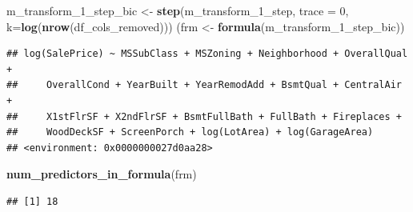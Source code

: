 \documentclass[
]{article}
\newenvironment{Shaded}{\begin{snugshade}}{\end{snugshade}}
\newcommand{\DataTypeTok}[1]{\textcolor[rgb]{0.13,0.29,0.53}{#1}}
\newcommand{\DecValTok}[1]{\textcolor[rgb]{0.00,0.00,0.81}{#1}}
\newcommand{\KeywordTok}[1]{\textcolor[rgb]{0.13,0.29,0.53}{\textbf{#1}}}
\newcommand{\NormalTok}[1]{#1}
\newcommand{\StringTok}[1]{\textcolor[rgb]{0.31,0.60,0.02}{#1}}
\begin{document}
\begin{Shaded}
\begin{Highlighting}[]
\NormalTok{m_transform_}\DecValTok{1}\NormalTok{_step_bic <-}\StringTok{ }\KeywordTok{step}\NormalTok{(m_transform_}\DecValTok{1}\NormalTok{_step, }\DataTypeTok{trace =} \DecValTok{0}\NormalTok{, }\DataTypeTok{k=}\KeywordTok{log}\NormalTok{(}\KeywordTok{nrow}\NormalTok{(df_cols_removed)))}
\NormalTok{(frm <-}\StringTok{ }\KeywordTok{formula}\NormalTok{(m_transform_}\DecValTok{1}\NormalTok{_step_bic))}
\end{Highlighting}
\end{Shaded}

\begin{verbatim}
## log(SalePrice) ~ MSSubClass + MSZoning + Neighborhood + OverallQual + 
##     OverallCond + YearBuilt + YearRemodAdd + BsmtQual + CentralAir + 
##     X1stFlrSF + X2ndFlrSF + BsmtFullBath + FullBath + Fireplaces + 
##     WoodDeckSF + ScreenPorch + log(LotArea) + log(GarageArea)
## <environment: 0x0000000027d0aa28>
\end{verbatim}

\begin{Shaded}
\begin{Highlighting}[]
\KeywordTok{num_predictors_in_formula}\NormalTok{(frm)}
\end{Highlighting}
\end{Shaded}

\begin{verbatim}
## [1] 18
\end{verbatim}
\end{document}

